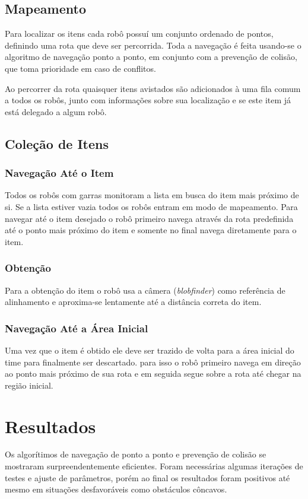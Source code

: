 \documentclass[11pt,oneside]{article}
\begin{document}
\subsection{Mapeamento}
Para localizar os itens cada robô possuí um conjunto ordenado de pontos, definindo uma rota que deve ser percorrida. Toda a navegação é feita usando-se o algoritmo de navegação ponto a ponto, em conjunto com a prevenção de colisão, que toma prioridade em caso de conflitos.

Ao percorrer da rota quaisquer itens avistados são adicionados à uma fila comum a todos os robôs, junto com informações sobre sua localização e se este item já está delegado a algum robô. 

\subsection{Coleção de Itens}
\label{garra}
\subsubsection{Navegação Até o Item}
Todos os robôs com garras monitoram a lista em busca do item mais próximo de si. Se a lista estiver vazia todos os robôs entram em modo de mapeamento. Para navegar até o item desejado o robô primeiro navega através da rota predefinida até o ponto mais próximo do item e somente no final navega diretamente para o item.

\subsubsection{Obtenção}
Para a obtenção do item o robô usa a câmera (\emph{blobfinder}) como referência de alinhamento e aproxima-se lentamente até a distância correta do item.

\subsubsection{Navegação Até a Área Inicial}
Uma vez que o item é obtido ele deve ser trazido de volta para a área inicial do time para finalmente ser descartado. para isso o robô primeiro navega em direção ao ponto mais próximo de sua rota e em seguida segue sobre a rota até chegar na região inicial. 

\section{Resultados}
Os algorítimos de navegação de ponto a ponto e prevenção de colisão se mostraram surpreendentemente eficientes. Foram necessárias algumas iterações de testes e ajuste de parâmetros, porém ao final os resultados foram positivos até mesmo em situações desfavoráveis como obstáculos côncavos.
\end{document}
